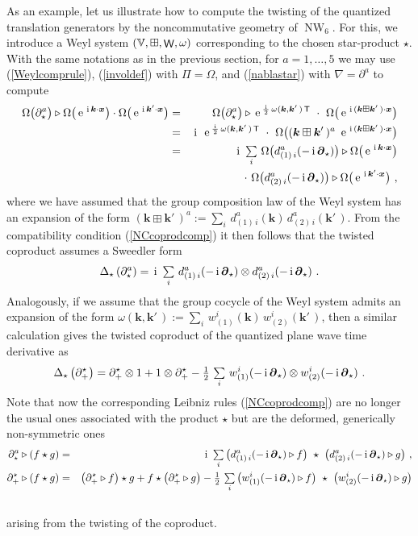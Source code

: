 \documentclass[11pt,a4paper]{article}
\DeclareMathOperator{\NW}{NW}
\DeclareMathOperator{\weyl}{{\sf W}}                   %
\newcommand{\comp}{\boxplus}                            %
\newcommand{\1}{\mathbb{1}}
\newcommand{\mbf}[1]{{\boldsymbol {#1} }}
\def\ii{{\,{\rm i}\,}}
\def\T{{\sf T}}
\def\mx{{\mbf x}}
\def\mk{{\mbf k}}
\def\mdell{{\mbf\partial}}
\def\mbbV{{\mathbb V}}
\def\e{{\,\rm e}\,}
\def\bea{\begin{eqnarray}}
\def\eea{\end{eqnarray}}
\newcommand{\beq}{\begin{eqnarray}}
\newcommand{\eeq}{\end{eqnarray}}
\begin{document}
As an example, let us illustrate how to compute the twisting of the
quantized translation generators by the noncommutative geometry of $\NW_6$. For
this, we introduce a Weyl system $(\mbbV,\comp,\weyl,\omega)$
corresponding to the chosen star-product $\star$. With the same
notations as in the previous section, for $a=1,\dots,5$ we may use
(\ref{Weylcomprule}), (\ref{involdef}) with $\Pi=\Omega$, and
(\ref{nablastar}) with $\nabla=\partial^a$ to compute
\bea
\Omega\bigl(\partial_\star^a\bigr)\triangleright\Omega\bigl(
\e^{\ii\mk\cdot\mx}\bigr)\cdot\Omega\bigl(\e^{\ii\mk'\cdot\mx}
\bigr)&=&\Omega\bigl(\partial_\star^a\bigr)\triangleright
\e^{\frac\ii2\,\omega(\mk,\mk'\,)\,\T}~\cdot~\Omega\bigl(
\e^{\ii(\mk\comp\mk'\,)\cdot\mx}\bigr) \nonumber\\ &=&
\ii~\e^{\frac\ii2\,\omega(\mk,\mk'\,)\,\T}~\cdot~\Omega
\bigl((\mk\comp\mk'\,)^a~\e^{\ii(\mk\comp\mk'\,)\cdot\mx}\bigr)
\nonumber\\ &=& \ii~\mbox{$\sum\limits_i$}~\Omega\bigl(d^a_{(1)\,i}(
-\ii\mdell_\star)\bigr)\triangleright\Omega\bigl(\e^{\ii\mk\cdot\mx}
\bigr)\nonumber\\ && \qquad\qquad
\cdot~\Omega\bigl(d^a_{(2)\,i}(-\ii\mdell_\star)\bigr)
\triangleright\Omega\bigl(\e^{\ii\mk'\cdot\mx}\bigr) \ ,
\label{partialstarderiv}\eea
where we have assumed that the group composition law of the Weyl
system has an expansion of the form
$(\mk\comp\mk'\,)^a:=\sum_i\,d^a_{(1)\,i}(\mk)\,d^a_{(2)\,i}(\mk'\,)$. From
the compatibility condition (\ref{NCcoprodcomp}) it then follows that
the twisted coproduct assumes a Sweedler form
\beq
\Delta_\star\left(\partial_\star^a\right)=\ii~
\mbox{$\sum\limits_i$}~d^a_{(1)\,i}(-\ii\mdell_\star)\otimes
d^a_{(2)\,i}(-\ii\mdell_\star) \ .
\label{Deltastarexpl}\eeq
Analogously, if we assume that the group cocycle of the Weyl system
admits an expansion of the form
$\omega(\mk,\mk'\,):=\sum_i\,w^i_{(1)}(\mk)\,w^i_{(2)}(\mk'\,)$, then
a similar calculation gives the twisted coproduct of the quantized
plane wave time derivative as
\beq
\Delta_\star\left(\partial_+^\star\right)=\partial_+^\star
\otimes1+1\otimes\partial_+^\star-\mbox{$\frac12\,\sum\limits_i$}~
w^i_{(1)}(-\ii\mdell_\star)\otimes w^i_{(2)}(-\ii\mdell_\star) \ .
\label{Deltastartime}\eeq
Note that now the corresponding Leibniz rules (\ref{NCcoprodcomp}) are
no longer the usual ones associated with the product $\star$ but are
the deformed, generically non-symmetric ones
\bea
\partial^a_\star\triangleright(f\star g)&=&\ii~\mbox{$\sum\limits_i$}\,
\bigl(d^a_{(1)\,i}(-\ii\mdell_\star)\triangleright f\bigr)~\star~\bigl(
d^a_{(2)\,i}(-\ii\mdell_\star)\triangleright g\bigr) \ , \nonumber\\
\partial_+^\star\triangleright(f\star g)&=&\left(\partial_+^\star
\triangleright f\right)\star g+f\star\left(\partial_+^\star
\triangleright g\right)-\mbox{$\frac12\,\sum\limits_i$}\,
\bigl(w^i_{(1)}(-\ii\mdell_\star)\triangleright f\bigr)~\star~
\bigl(w^i_{(2)}(-\ii\mdell_\star)\triangleright g\bigr) \nonumber\\ &&
\label{defLeibniz}\eea
arising from the twisting of the coproduct.
\end{document}
